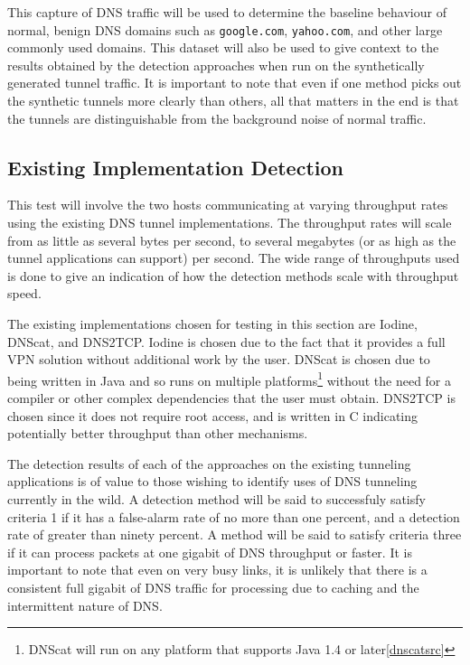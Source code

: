 \documentclass[12pt]{report}
\theoremstyle{remark}
\theoremstyle{definition}
\theoremstyle{definition}
\theoremstyle{definition}
\begin{document}
This capture of DNS traffic will be used to determine the baseline behaviour of
normal, benign DNS domains such as \texttt{google.com}, \texttt{yahoo.com}, and
other large commonly used domains. This dataset will also be used to give
context to the results obtained by the detection approaches when run on the
synthetically generated tunnel traffic. It is important to note that even if one
method picks out the synthetic tunnels more clearly than others, all that
matters in the end is that the tunnels are distinguishable from the background
noise of normal traffic.

\subsection{Existing Implementation Detection} \label{existingtest} This test
will involve the two hosts communicating at varying throughput rates using the
existing DNS tunnel implementations. The throughput rates will scale from as
little as several bytes per second, to several megabytes (or as high as the
tunnel applications can support) per second. The wide range of throughputs used
is done to give an indication of how the detection methods scale with throughput
speed.

The existing implementations chosen for testing in this section are
Iodine\cite{iodinesrc}, DNScat\cite{dnscatsrc}, and DNS2TCP\cite{dns2tcpsrc}.
Iodine is chosen due to the fact that it provides a full VPN solution without
additional work by the user. DNScat is chosen due to being written in Java and
so runs on multiple platforms\footnote{DNScat will run on any platform that
supports Java 1.4 or later\ref{dnscatsrc}} without the need for a compiler or
other complex dependencies that the user must obtain. DNS2TCP is chosen since it
does not require root access, and is written in C indicating potentially better
throughput than other mechanisms.

The detection results of each of the approaches on the existing tunneling
applications is of value to those wishing to identify uses of DNS tunneling
currently in the wild. A detection method will be said to successfuly satisfy
criteria 1 if it has a false-alarm rate of no more than one percent, and a
detection rate of greater than ninety percent. A method will be said to satisfy
criteria three if it can process packets at one gigabit of DNS throughput or
faster. It is important to note that even on very busy links, it is unlikely
that there is a consistent full gigabit of DNS traffic for processing due to
caching and the intermittent nature of DNS.
\end{document}
